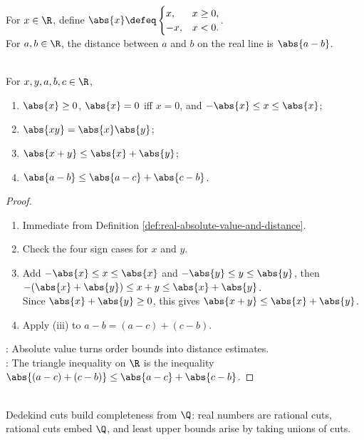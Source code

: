 \begin{definition} \label{def:real-absolute-value-and-distance} \\
For $x\in\R$, define $\abs{x}\defeq
\begin{cases}
x, & x\geq0,\\
-x, & x<0.
\end{cases}$.\\
For $a,b\in\R$, the distance between $a$ and $b$ on the real line is $\abs{a-b}$.
\end{definition}

\begin{proposition} \label{prop:real-absolute-value-triangle-inequality} \\
For $x,y,a,b,c\in\R$,
\begin{enumerate}[label=(\roman*)]
\setlength{\itemsep}{0pt}
\item $\abs{x}\geq0$, $\abs{x}=0$ iff $x=0$, and $-\abs{x}\leq x\leq\abs{x}$;
\item $\abs{xy}=\abs{x}\abs{y}$;
\item $\abs{x+y}\leq\abs{x}+\abs{y}$;
\item $\abs{a-b}\leq\abs{a-c}+\abs{c-b}$.
\end{enumerate}
\begin{proof}
\begin{enumerate}[label=(\roman*)]
\setlength{\itemsep}{0pt}
\item Immediate from Definition \ref{def:real-absolute-value-and-distance}.
\item Check the four sign cases for $x$ and $y$.
\item Add $-\abs{x}\leq x\leq\abs{x}$ and $-\abs{y}\leq y\leq\abs{y}$, then $-(\abs{x}+\abs{y})\leq x+y\leq\abs{x}+\abs{y}$.\\
Since $\abs{x}+\abs{y}\geq0$, this gives $\abs{x+y}\leq\abs{x}+\abs{y}$.
\item Apply (iii) to $a-b=(a-c)+(c-b)$.
\end{enumerate}
: Absolute value turns order bounds into distance estimates.\\
: The triangle inequality on $\R$ is the inequality $\abs{(a-c)+(c-b)}\leq\abs{a-c}+\abs{c-b}$.
\end{proof}
\end{proposition}

\begin{perspective} \label{per:dedekind-construction-as-completeness-proof} \\
Dedekind cuts build completeness from $\Q$: real numbers are rational cuts, rational cuts embed $\Q$, and least upper bounds arise by taking unions of cuts.
\end{perspective}


